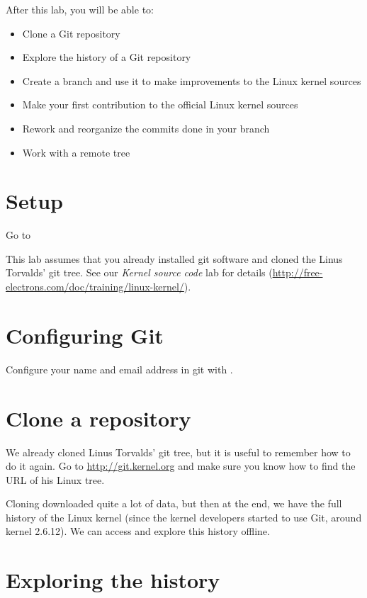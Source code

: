 
After this lab, you will be able to:

\begin{itemize}
\item Clone a Git repository
\item Explore the history of a Git repository
\item Create a branch and use it to make improvements to the Linux kernel sources
\item Make your first contribution to the official Linux kernel sources
\item Rework and reorganize the commits done in your branch
\item Work with a remote tree 
\end{itemize}

\section{Setup}

Go to 

This lab assumes that you already installed git software and cloned
the Linus Torvalds' git tree. See our {\em Kernel source code} lab for
details (\url{http://free-electrons.com/doc/training/linux-kernel/}).

\section{Configuring Git}

Configure your name and email address in git with .

\section{Clone a repository}

We already cloned Linus Torvalds' git tree, but it is useful to remember
how to do it again. Go to \url{http://git.kernel.org} and make sure you know
how to find the  URL of his Linux tree.

Cloning downloaded quite a lot of data, but then at the end, we have
the full history of the Linux kernel (since the kernel developers
started to use Git, around kernel 2.6.12). We can access and explore
this history offline.

\section{Exploring the history}

